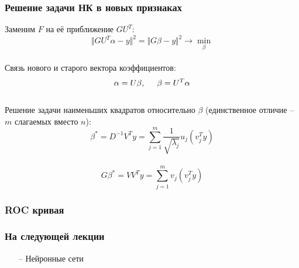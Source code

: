 \documentclass[12pt]{beamer}
\begin{document}
\begin{frame}\frametitle{Решение задачи НК в новых признаках}
Заменим $F$ на её приближение $GU^T$:\\
$$\Vert GU^T\alpha -y \Vert^2 = \Vert G\beta -y \Vert^2 \rightarrow \min\limits_{\beta}$$\\
Связь нового и старого вектора коэффициентов:\\
$$\alpha = U\beta, \hspace{5mm} \beta = U^T \alpha$$\\
Решение задачи наименьших квадратов относительно $\beta$ (единственное отличие -- $m$ слагаемых вместо $n$):\\
$$\beta^* = D^{-1}V^Ty = \sum\limits_{j=1}^m \frac{1}{\sqrt{\lambda_j}} u_j (v_j^Ty)$$\\
$$G\beta^* = VV^Ty = \sum\limits_{j=1}^m v_j (v_j^Ty)$$
\end{frame}

\begin{frame}\frametitle{ROC кривая}
\end{frame}


\begin{frame}\frametitle{На следующей лекции}
\begin{itemize}
\item[--] Нейронные сети
\end{itemize}
\end{frame}
\end{document}
